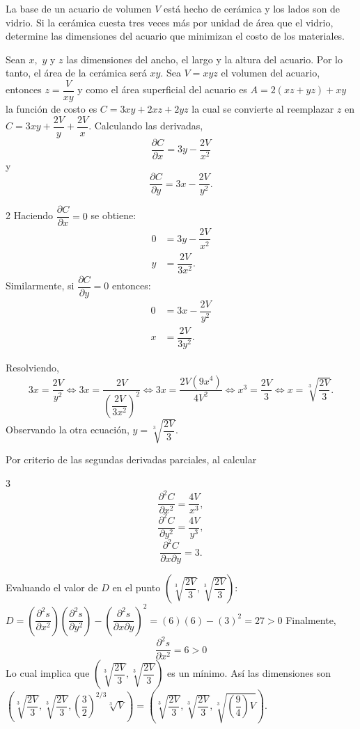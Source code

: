 \begin{prob}
La base de un acuario de volumen $V$ está hecho de cerámica y los lados son de vidrio. Si la cerámica cuesta tres veces más por unidad de área que el vidrio, determine las dimensiones del acuario que minimizan el costo de los materiales.
\begin{myproof}
Sean $x,$ $y$ y $z$ las dimensiones del ancho, el largo y la altura del acuario. Por lo tanto, el área de la cerámica será $xy.$ Sea $V=xyz$ el volumen del acuario, entonces $z=\dfrac{V}{xy}$ y como el área superficial del acuario es $A=2(xz+yz)+xy$ la función de costo es $C=3xy+2xz+2yz$ la cual se convierte al reemplazar $z$ en $C=3xy+\dfrac{2V}{y}+\dfrac{2V}{x}.$ 
Calculando las derivadas, $$\dfrac{\partial C}{\partial x}=3y-\dfrac{2V}{x^2}$$ y  $$\dfrac{\partial C}{\partial y}=3x-\dfrac{2V}{y^2}.$$
\begin{multicols}{2}
Haciendo $\dfrac{\partial C}{\partial x}=0$ se obtiene:
\begin{align*}
0&=3y-\dfrac{2V}{x^2}\\
y&=\dfrac{2V}{3x^2}.
\end{align*}
\columnbreak
Similarmente, si $\dfrac{\partial C}{\partial y}=0$ entonces:
\begin{align*}
0&=3x-\dfrac{2V}{y^2}\\
x&=\dfrac{2V}{3y^2}.
\end{align*}
\end{multicols}
Resolviendo,
$$3x=\dfrac{2V}{y^2}\Leftrightarrow 3x=\dfrac{2V}{\left( \dfrac{2V}{3x^2} \right)^2} \Leftrightarrow 3x=\dfrac{2V(9x^4)}{4V^2}\Leftrightarrow x^3=\dfrac{2V}{3}\Leftrightarrow x=\sqrt[3]{\dfrac{2V}{3}}.$$
Observando la otra ecuación, $y=\sqrt[3]{\dfrac{2V}{3}}.$
 
Por criterio de las segundas derivadas parciales, al calcular 
\begin{multicols}{3}
$$\dfrac{\partial^2 C}{\partial x^2}=\dfrac{4V}{x^3},$$ $$\dfrac{\partial^2 C}{\partial y^2}=\dfrac{4V}{y^3},$$ $$\dfrac{\partial^2 C}{\partial x\partial y}=3.$$
\end{multicols}
Evaluando el valor de $D$ en el punto $\left( \sqrt[3]{\dfrac{2V}{3}},\sqrt[3]{\dfrac{2V}{3}} \right)$:
$D=\left(\dfrac{\partial^2 s}{\partial x^2}\right)\left(\dfrac{\partial^2 s}{\partial y^2}\right)-\left(\dfrac{\partial^2 s}{\partial x\partial y}\right)^2=\left(  6  \right)\left( 6 \right)-\left(3 \right)^2 = 27>0$
Finalmente,  $$\dfrac{\partial^2 s}{\partial x^2}=6>0$$
Lo cual implica que $\left( \sqrt[3]{\dfrac{2V}{3}},\sqrt[3]{\dfrac{2V}{3}} \right)$ es un mínimo. Así las dimensiones son $\left( \sqrt[3]{\dfrac{2V}{3}},\sqrt[3]{\dfrac{2V}{3}},\left(\dfrac{3}{2}\right)^{2/3}\sqrt[3]{V} \right)=\left( \sqrt[3]{\dfrac{2V}{3}},\sqrt[3]{\dfrac{2V}{3}},\sqrt[3]{\left(\dfrac{9}{4}\right){V}} \right).$
\end{myproof}
\end{prob}

